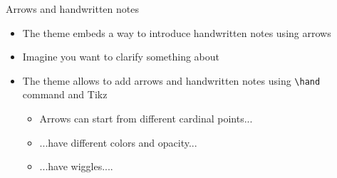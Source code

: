 \documentclass[10pt,itemsep]{beamer}
\begin{document}
\begin{frame}[t]
    {Arrows and handwritten notes}\bigskip
    \begin{itemize}
        \item The theme embeds a way to introduce handwritten notes using arrows \bigskip
        \item Imagine you want to clarify something about  \bigskip
        \item The theme allows to add arrows and handwritten notes using \texttt{\textbackslash hand} command and Tikz 
        \begin{itemize}
            \item Arrows can start from different cardinal points... 
            \item ...have different colors and opacity... 
            \item ...have wiggles....
        \end{itemize}
    \end{itemize}
\end{frame}
\shownotesblock{}
\end{document}
